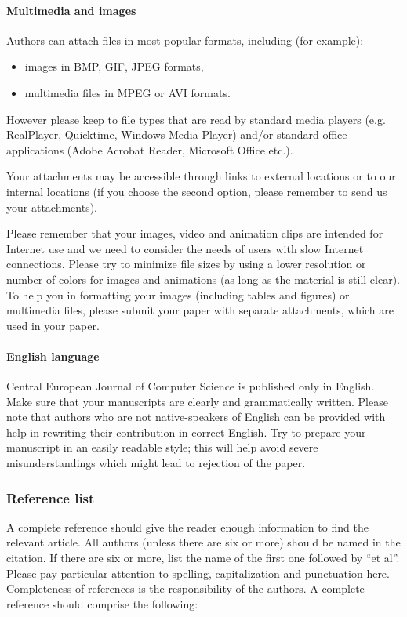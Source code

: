 \documentclass[CEJCS,PDF]{cej} %
\begin{document}
\paragraph{Multimedia and images}
    Authors can attach files in most popular formats, including (for example):
\begin{itemize}
\item images in BMP, GIF, JPEG formats,
\item multimedia files in MPEG or AVI formats.
\end{itemize}

However please keep to file types that are read by standard media players (e.g. RealPlayer, Quicktime, Windows Media Player) and/or standard office applications (Adobe Acrobat Reader, Microsoft Office etc.).

    Your attachments may be accessible through links to external locations or to our internal locations (if you choose the second option, please remember to send us your attachments).

    Please remember that your images, video and animation clips are intended for Internet use and we need to consider the needs of users with slow Internet connections. Please try to minimize file sizes by using a lower resolution or number of colors for images and animations (as long as the material is still clear). To help you in formatting your images (including tables and figures) or multimedia files, please submit your paper with separate attachments, which are used in your paper.

\paragraph{English language}
    Central European Journal of Computer Science is published only in English. Make sure that your manuscripts are clearly and grammatically written. Please note that authors who are not native-speakers of English can be provided with help in rewriting their contribution in correct English. Try to prepare your manuscript in an easily readable style; this will help avoid severe misunderstandings which might lead to rejection of the paper.

\subsubsection{Reference list}

A complete reference should give the reader enough information to find the relevant article. All authors (unless there are six or more) should be named in the citation. If there are six or more, list the name of the first one followed by ``et al''. Please pay particular attention to spelling, capitalization and punctuation here. Completeness of references is the responsibility of the authors. A complete reference should comprise the following:
\end{document}
